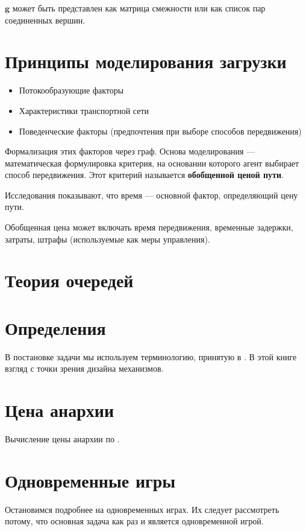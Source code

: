 $\mathbf{g}$ может быть представлен как матрица смежности или как список пар соединенных вершин.


\section{Принципы моделирования загрузки}
\begin{itemize}
	\item Потокообразующие факторы
	\item Характеристики транспортной сети
	\item Поведенческие факторы (предпочтения при выборе способов передвижения)
\end{itemize}

Формализация этих факторов через граф.
Основа моделирования — математическая формулировка критерия, на основании которого агент выбирает способ передвижения. Этот критерий называется \textbf{обобщенной ценой пути}.

Исследования показывают, что время --- основной фактор, определяющий цену пути.\cite[4]{matmod_shvetsov}

Обобщенная цена может включать время передвижения, временные задержки, затраты, штрафы (используемые как меры управления).


\section{Теория очередей}


\section{Определения}
В постановке задачи мы используем терминологию, принятую в \cite[с. 461, Tim Roughgarden, Routing games]{agt2007}.
В этой книге взгляд с точки зрения дизайна механизмов.

\section{Цена анархии}
\cite{rough2001}
\cite{rough2005}

Вычисление цены анархии по \cite[69]{rough2005}.



\section{Одновременные игры}

Остановимся подробнее на одновременных играх. Их следует рассмотреть потому, что основная задача как раз и является одновременной игрой.




